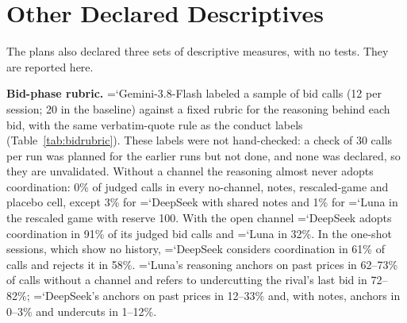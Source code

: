 \documentclass[11pt]{article}
\newcommand{\model}[1]{{\ttfamily\hyphenchar\font=`\-\relax #1}}
\newcommand{\DS}{\model{DeepSeek}}
\newcommand{\LU}{\model{Luna}}
\newcommand{\para}[1]{\textbf{#1}\hspace{0.4em}}
\begin{document}
\section{Other Declared Descriptives}
\label{app:descriptives}
The plans also declared three sets of descriptive measures, with no tests. They are reported here.

\para{Bid-phase rubric.} \model{Gemini-3.8-Flash} labeled a sample of bid calls (12 per session; 20 in the baseline) against a fixed rubric for the reasoning behind each bid, with the same verbatim-quote rule as the conduct labels (Table~\ref{tab:bidrubric}). These labels were not hand-checked: a check of 30 calls per run was planned for the earlier runs but not done, and none was declared, so they are unvalidated. Without a channel the reasoning almost never adopts coordination: 0\% of judged calls in every no-channel, notes, rescaled-game and placebo cell, except 3\% for \DS{} with shared notes and 1\% for \LU{} in the rescaled game with reserve 100. With the open channel \DS{} adopts coordination in 91\% of its judged bid calls and \LU{} in 32\%. In the one-shot sessions, which show no history, \DS{} considers coordination in 61\% of calls and rejects it in 58\%. \LU's reasoning anchors on past prices in 62--73\% of calls without a channel and refers to undercutting the rival's last bid in 72--82\%; \DS's anchors on past prices in 12--33\% and, with notes, anchors in 0--3\% and undercuts in 1--12\%.

\begin{table}[t]
\centering\small
\caption{Bid-phase rubric: \% of judged bid calls with each label, by run, arm and model. Not hand-checked. \textbf{Calls}: judged bid calls; \textbf{Rival}: models the rival; \textbf{Cons.}, \textbf{Adopts}, \textbf{Rejects}: considers, adopts or rejects coordination; \textbf{Punish}: plans to punish or reward the rival; \textbf{Copies}, \textbf{Undercuts}: copies or undercuts the rival's last bid; \textbf{Anchors}: anchors on a past price. --: label not in the rubric version run on that sample. In the placebo only firm A, the model firm, is judged.}
\label{tab:bidrubric}
\setlength{\tabcolsep}{3.5pt}
\end{table}
\end{document}
